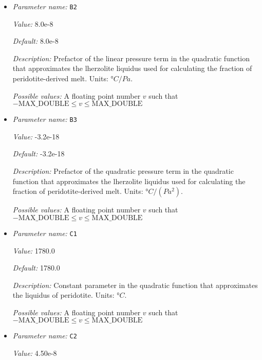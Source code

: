 \begin{itemize}
{\it Possible values:} A floating point number $v$ such that $-\text{MAX\_DOUBLE} \leq v \leq \text{MAX\_DOUBLE}$
\item {\it Parameter name:} {\tt B2}
\label{parameters:Postprocess/Visualization/Melt fraction/B2}


{\it Value:} 8.0e-8


{\it Default:} 8.0e-8


{\it Description:} Prefactor of the linear pressure term in the quadratic function that approximates the  lherzolite liquidus used for calculating the fraction of peridotite-derived melt. Units: $°C/Pa$.


{\it Possible values:} A floating point number $v$ such that $-\text{MAX\_DOUBLE} \leq v \leq \text{MAX\_DOUBLE}$
\item {\it Parameter name:} {\tt B3}
\label{parameters:Postprocess/Visualization/Melt fraction/B3}


{\it Value:} -3.2e-18


{\it Default:} -3.2e-18


{\it Description:} Prefactor of the quadratic pressure term in the quadratic function that approximates the  lherzolite liquidus used for calculating the fraction of peridotite-derived melt. Units: $°C/(Pa^2)$.


{\it Possible values:} A floating point number $v$ such that $-\text{MAX\_DOUBLE} \leq v \leq \text{MAX\_DOUBLE}$
\item {\it Parameter name:} {\tt C1}
\label{parameters:Postprocess/Visualization/Melt fraction/C1}


{\it Value:} 1780.0


{\it Default:} 1780.0


{\it Description:} Constant parameter in the quadratic function that approximates the liquidus of peridotite. Units: $°C$.


{\it Possible values:} A floating point number $v$ such that $-\text{MAX\_DOUBLE} \leq v \leq \text{MAX\_DOUBLE}$
\item {\it Parameter name:} {\tt C2}
\label{parameters:Postprocess/Visualization/Melt fraction/C2}


{\it Value:} 4.50e-8



\end{itemize}
